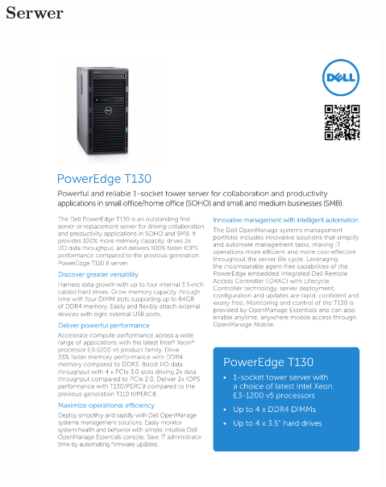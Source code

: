 \documentclass[a4paper, 12pt]{article}
\begin{document}
\subsection{Serwer}
\begin{figure}[H]
\centering
    \includegraphics[scale=0.80]{spec/serwer.pdf}
    \label{fig:PropProf}
\end{figure}
\end{document}
